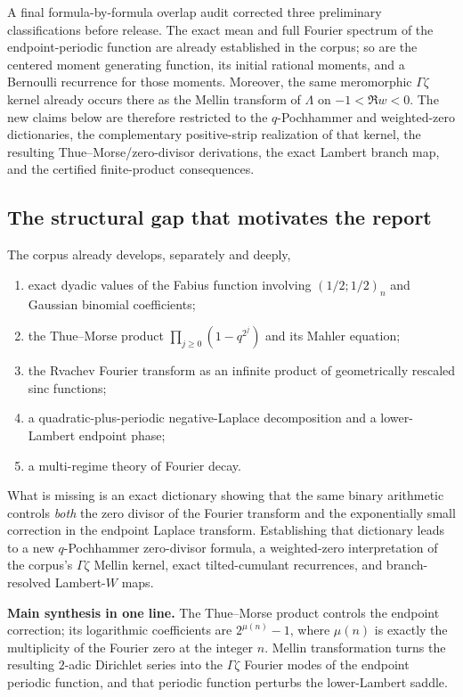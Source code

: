 \documentclass[11pt]{article}
\numberwithin{equation}{section}
\theoremstyle{definition}
\theoremstyle{remark}
\begin{document}
A final formula-by-formula overlap audit corrected three preliminary classifications before
release.  The exact mean and full Fourier spectrum of the endpoint-periodic function are
already established in the corpus; so are the centered moment generating function, its
initial rational moments, and a Bernoulli recurrence for those moments.  Moreover, the
same meromorphic $\Gamma\zeta$ kernel already occurs there as the Mellin transform of
$\Lambda$ on $-1<\Re w<0$.  The new claims below are therefore restricted to the
$q$-Pochhammer and weighted-zero dictionaries, the complementary positive-strip
realization of that kernel, the resulting Thue--Morse/zero-divisor derivations, the exact
Lambert branch map, and the certified finite-product consequences.

\subsection{The structural gap that motivates the report}
The corpus already develops, separately and deeply,
\begin{enumerate}
\item exact dyadic values of the Fabius function involving $(1/2;1/2)_n$ and Gaussian
binomial coefficients;
\item the Thue--Morse product $\prod_{j\ge0}(1-q^{2^j})$ and its Mahler equation;
\item the Rvachev Fourier transform as an infinite product of geometrically rescaled sinc
functions;
\item a quadratic-plus-periodic negative-Laplace decomposition and a lower-Lambert endpoint
phase;
\item a multi-regime theory of Fourier decay.
\end{enumerate}
What is missing is an exact dictionary showing that the same binary arithmetic controls
\emph{both} the zero divisor of the Fourier transform and the exponentially small correction
in the endpoint Laplace transform.  Establishing that dictionary leads to a new
$q$-Pochhammer zero-divisor formula, a weighted-zero interpretation of the corpus's
$\Gamma\zeta$ Mellin kernel, exact tilted-cumulant recurrences, and branch-resolved
Lambert-$W$ maps.

\begin{boxedremark}
\textbf{Main synthesis in one line.}
The Thue--Morse product controls the endpoint correction; its logarithmic coefficients are
$2^{\mu(n)}-1$, where $\mu(n)$ is exactly the multiplicity of the Fourier zero at the integer
$n$.  Mellin transformation turns the resulting $2$-adic Dirichlet series into the
$\Gamma\zeta$ Fourier modes of the endpoint periodic function, and that periodic function
perturbs the lower-Lambert saddle.
\end{boxedremark}
\end{document}
